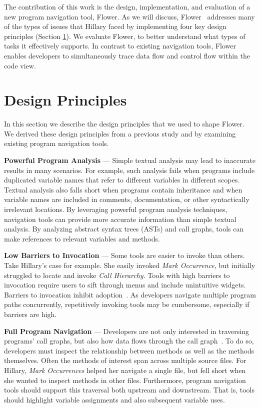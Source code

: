 \documentclass[conference]{IEEEtran}
\newcommand{\toolName}{Flower}
\begin{document}
The contribution of this work is the design, implementation, and evaluation of a new program navigation tool, \toolName.
As we will discuss, \toolName~ addresses many of the types of issues that Hillary faced by implementing four key design principles (Section \ref{DesignPrinciples}).
We evaluate \toolName, to better understand what types of tasks it effectively supports. 
In contrast to existing navigation tools, \toolName~ enables developers to simultaneously trace data flow and control flow within the code view. 


\section{Design Principles}
\label{DesignPrinciples}
In this section we describe the design principles that we used to shape \toolName. We derived these design principles from a previous study \cite{Smith2015} and by examining existing program navigation tools.
 
\vspace{1em} 
\noindent\textbf{Powerful Program Analysis} ---
Simple textual analysis may lead to inaccurate results in many scenarios. For example, such analysis fails when programs include duplicated variable names that refer to different variables in different scopes. Textual analysis also falls short when programs contain inheritance and when variable names are included in comments, documentation, or other syntactically irrelevant locations.
By leveraging powerful program analysis techniques, navigation tools can provide more accurate information than simple textual analysis.
By analyzing abstract syntax trees (ASTs) and call graphs, tools can make references to relevant variables and methods. 

\vspace{1em} 
\noindent\textbf{Low Barriers to Invocation} ---
Some tools are easier to invoke than others. 
Take Hillary's case for example.
She easily invoked \emph{Mark Occurrence}, but initially struggled to locate and invoke \emph{Call Hierarchy}.
Tools with high barriers to invocation require users to sift through menus and include unintuitive widgets. 
Barriers to invocation inhibit adoption~\cite{johnson2013don}.
As developers navigate multiple program paths concurrently, repetitively invoking tools may be cumbersome, especially if barriers are high. 


\vspace{1em} 
\noindent\textbf{Full Program Navigation}  ---
Developers are not only interested in traversing programs' call graphs, but also how data flows through the call graph~\cite{Smith2015}.
To do so, developers must inspect the relationship between methods as well as the methods themselves.
Often the methods of interest span across multiple source files.
For Hillary, \emph{Mark Occurrences} helped her navigate a single file, but fell short when she wanted to inspect methods in other files.
Furthermore, program navigation tools should support this traversal both upstream and downstream. 
That is, tools should highlight variable assignments and also subsequent variable uses. 
\end{document}

